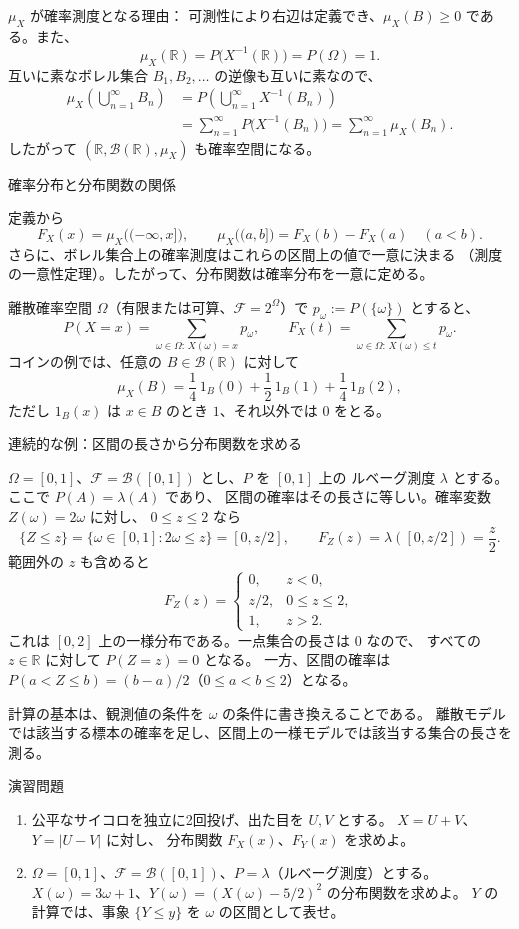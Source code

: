 \documentclass[a4paper,10pt,pdflatex,ja=standard,jafont=ipaex-type1,
  magstyle=real,scale=1]{bxjsarticle}
\newcommand{\topic}[1]{\par\vspace{5pt}
  {\large\sffamily\mdseries\color{accent}#1}\par\vspace{2pt}}
\newcommand{\keybox}[1]{\par\vspace{3pt}\begingroup
  \setlength{\fboxsep}{5pt}
  \colorbox{soft}{\parbox{\dimexpr\linewidth-2\fboxsep\relax}{#1}}%
  \endgroup\par\vspace{2pt}}
\newcommand{\examplelabel}[1]{{\sffamily\mdseries\color{ink}#1}}
\newcommand{\F}{\mathcal F}
\newcommand{\R}{\mathbb R}
\begin{document}
\examplelabel{$\mu_X$ が確率測度となる理由：}
可測性により右辺は定義でき、$\mu_X(B)\ge0$ である。また、
$$
  \mu_X(\R)=P\bigl(X^{-1}(\R)\bigr)=P(\Omega)=1.
$$
互いに素なボレル集合 $B_1,B_2,\ldots$ の逆像も互いに素なので、
$$
  \begin{aligned}
    \mu_X\!\left(\bigcup_{n=1}^{\infty}B_n\right)
      &=P\!\left(\bigcup_{n=1}^{\infty}X^{-1}(B_n)\right)\\
      &=\sum_{n=1}^{\infty}P\bigl(X^{-1}(B_n)\bigr)
       =\sum_{n=1}^{\infty}\mu_X(B_n).
  \end{aligned}
$$
したがって $(\R,\mathcal B(\R),\mu_X)$ も確率空間になる。

\topic{確率分布と分布関数の関係}
定義から
$$
  F_X(x)=\mu_X\bigl((-\infty,x]\bigr),\qquad
  \mu_X\bigl((a,b]\bigr)=F_X(b)-F_X(a)\quad(a<b).
$$
さらに、ボレル集合上の確率測度はこれらの区間上の値で一意に決まる
（測度の一意性定理）。したがって、分布関数は確率分布を一意に定める。

離散確率空間 $\Omega$（有限または可算、$\F=2^\Omega$）で
$p_\omega:=P(\{\omega\})$ とすると、
$$
  P(X=x)=\sum_{\omega\in\Omega:\,X(\omega)=x}p_\omega,
  \qquad
  F_X(t)=\sum_{\omega\in\Omega:\,X(\omega)\le t}p_\omega.
$$
コインの例では、任意の $B\in\mathcal B(\R)$ に対して
$$
  \mu_X(B)=\frac14\,\mathrm{1}_B(0)
           +\frac12\,\mathrm{1}_B(1)
           +\frac14\,\mathrm{1}_B(2),
$$
ただし $\mathrm{1}_B(x)$ は $x\in B$ のとき $1$、それ以外では $0$ をとる。

\topic{連続的な例：区間の長さから分布関数を求める}
$\Omega=[0,1]$、$\F=\mathcal B([0,1])$ とし、$P$ を $[0,1]$ 上の
ルベーグ測度 $\lambda$ とする。ここで $P(A)=\lambda(A)$ であり、
区間の確率はその長さに等しい。確率変数 $Z(\omega)=2\omega$ に対し、
$0\le z\le2$ なら
$$
  \{Z\le z\}=\{\omega\in[0,1]:2\omega\le z\}=[0,z/2],
  \qquad F_Z(z)=\lambda([0,z/2])=\frac z2.
$$
範囲外の $z$ も含めると
$$
  F_Z(z)=
  \begin{cases}
    0, & z<0,\\
    z/2, & 0\le z\le2,\\
    1, & z>2.
  \end{cases}
$$
これは $[0,2]$ 上の一様分布である。一点集合の長さは $0$ なので、
すべての $z\in\R$ に対して $P(Z=z)=0$ となる。
一方、区間の確率は $P(a<Z\le b)=(b-a)/2$（$0\le a<b\le2$）となる。

\keybox{計算の基本は、観測値の条件を $\omega$ の条件に書き換えることである。
離散モデルでは該当する標本の確率を足し、区間上の一様モデルでは該当する集合の長さを測る。}

\newpage
\topic{演習問題}
\begin{enumerate}[label=\arabic*.]
  \item 公平なサイコロを独立に2回投げ、出た目を $U,V$ とする。
  $X=U+V$、$Y=|U-V|$ に対し、
  分布関数 $F_X(x)$、$F_Y(x)$ を求めよ。
  \item $\Omega=[0,1]$、$\F=\mathcal B([0,1])$、$P=\lambda$（ルベーグ測度）とする。
  $X(\omega)=3\omega+1$、$Y(\omega)=(X(\omega)-5/2)^2$ の分布関数を求めよ。
  $Y$ の計算では、事象 $\{Y\le y\}$ を $\omega$ の区間として表せ。
\end{enumerate}
\end{document}
